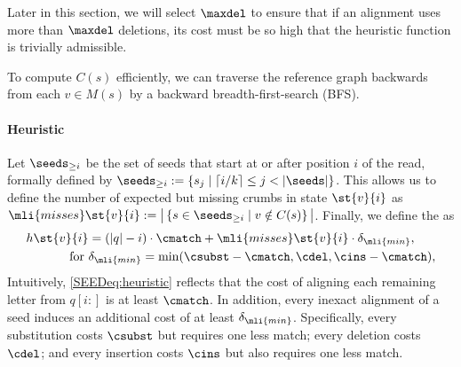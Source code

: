 Later in this section, we will select $\maxdel$ to ensure that if an alignment
uses more than $\maxdel$ deletions, its cost must be so high that the heuristic
function is trivially admissible.

To compute $C(s)$ efficiently, we can traverse the reference graph backwards
from each $v \in M(s)$ by a backward breadth-first-search (BFS).


\paragraph{Heuristic}
%
Let $\seeds_{\ge i}$ be the set of seeds that start at or after position $i$ of
the read, formally defined by $\seeds_{\ge i} := \{s_{j} \mid \lceil i / k
\rceil \leq j < |\seeds|  \}$.
%
This allows us to define the number of expected but missing crumbs in state
$\st{v}{i}$ as $\mli{misses}\st{v}{i} := \big\lvert \left\{  s
\in \seeds_{\ge i} \mid v \notin C(s) \right \} \big\rvert$.
%
Finally, we define the \sh as
\begin{align} \label{SEEDeq:heuristic}
	h\st{v}{i} &= (\lvert q \rvert - i) \cdot \cmatch + \mli{misses}\st{v}{i} \cdot \delta_\mli{min},\\
	\text{for } &\delta_\mli{min} = \min(\csubst - \cmatch,\cdel,\cins - \cmatch), \label{SEEDeq:delta}
\end{align}
%
Intuitively, \cref{SEEDeq:heuristic} reflects that the cost of aligning each
remaining letter from $q[i{:}]$ is at least $\cmatch$. In addition, every
inexact alignment of a seed induces an additional cost of at least
$\delta_\mli{min}$. 
%
Specifically, every substitution costs $\csubst$ but requires one less match;
every deletion costs $\cdel$; and every insertion costs $\cins$ but also
requires one less match.

